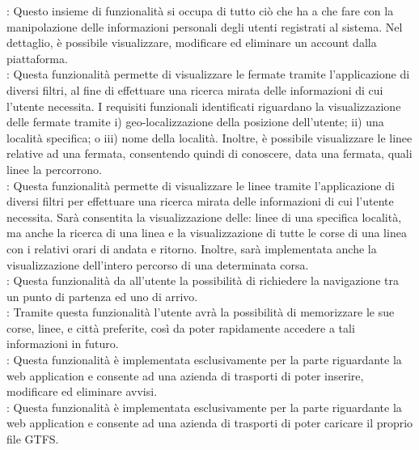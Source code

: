 : Questo insieme di funzionalit\`{a} si occupa di tutto ci\`{o} che ha a che fare con la manipolazione delle informazioni personali degli utenti registrati al sistema. Nel dettaglio, \`{e} possibile visualizzare, modificare ed eliminare un account dalla piattaforma.\\

: Questa funzionalit\`{a} permette di visualizzare le fermate tramite l\rq applicazione di diversi filtri, al fine di effettuare una ricerca mirata delle informazioni di cui l\rq utente necessita. I requisiti funzionali identificati riguardano la visualizzazione delle fermate tramite i) geo-localizzazione della posizione dell'utente; ii) una localit\`{a} specifica; o iii) nome della localit\`{a}. Inoltre, \`{e} possibile visualizzare le linee relative ad una fermata, consentendo quindi di conoscere, data una fermata, quali linee la percorrono.\\

: Questa funzionalit\`{a} permette di visualizzare le linee tramite l\rq applicazione di diversi filtri per effettuare una ricerca mirata delle informazioni di cui l\rq utente necessita. Sar\`{a} consentita la visualizzazione delle: linee di una specifica localit\`{a}, ma anche la ricerca di una linea e la visualizzazione di tutte le corse di una linea con i relativi orari di andata e ritorno. Inoltre, sar\`{a} implementata anche la visualizzazione dell'intero percorso di una determinata corsa.\\

: Questa funzionalit\`{a} da all'utente la possibilit\`{a} di richiedere la navigazione tra un punto di partenza ed uno di arrivo.\\

: Tramite questa funzionalit\`{a} l'utente avr\`{a} la possibilit\`{a} di memorizzare le sue corse, linee, e citt\`{a} preferite, cos\`{i} da poter rapidamente accedere a tali informazioni in futuro.\\

: Questa funzionalit\`{a} \`{e} implementata esclusivamente per la parte riguardante la web application e consente ad una azienda di trasporti di poter inserire, modificare ed eliminare avvisi.\\

: Questa funzionalit\`{a} \`{e} implementata esclusivamente per la parte riguardante la web application e consente ad una azienda di trasporti di poter caricare il proprio file GTFS.

